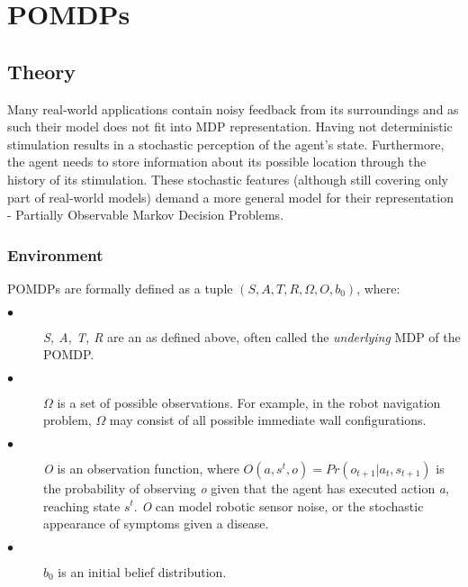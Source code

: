 
\part{POMDPs}

\chapter{Theory}

Many real-world applications contain noisy feedback from its surroundings and as such their model does not fit into MDP representation. Having not deterministic stimulation results in a stochastic perception of the agent's state. Furthermore, the agent needs to store information about its possible location through the history of its stimulation. These stochastic features (although still covering only part of real-world models) demand a more general model for their representation - Partially Observable Markov Decision Problems. 

\section{Environment}
\begin{definition}\label{def:POMDP}
POMDPs \cite{Shani2013} are formally defined as a tuple $(S, A, T, R, \Omega, O, b_0)$, where:
\begin{description}
  \item[$\bullet$ ] \textit{S, A, T, R} are an \label{MDP} as defined above, often called the \textit{underlying} MDP of the POMDP.
  \item[$\bullet$ ] $\Omega$ is a set of possible observations. For example, in the robot navigation problem, $\Omega$ may
consist of all possible immediate wall configurations.
  \item[$\bullet$ ] \textit{O} is an observation function, where $O(a,s^t, o) = Pr(o_{t+1}|a_t,s_{t+1})$ is the probability of
observing \textit{o} given that the agent has executed action \textit{a}, reaching state \textit{$s^t$}. \textit{O} can model
robotic sensor noise, or the stochastic appearance of symptoms given a disease.
  \item[$\bullet$ ] $b_0$ is an initial belief distribution.
\end{description}

\end{definition}

